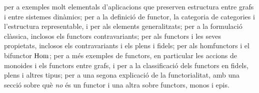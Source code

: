 \begin{resumcap}
 \cite[part~III, sessions~11--17]{lawvereschanuel} per a exemples molt elementals d'aplicacions que preserven estructura entre grafs i entre sistemes dinàmics; \cite[§1.3 i §§7.1--7.2]{awodey} per a la definició de functor, la categoria de categories i l'estructura representable, i \cite[§2.3]{awodey} per als elements generalitzats; \cite[I.3, II.2 i II.5]{maclane} per a la formulació clàssica, inclosos els functors contravariants; \cite[§1.2]{leinster} per als functors i les seves propietats, inclosos els contravariants i els plens i fidels; \cite[cap.~1]{riehl} per als homfunctors i el bifunctor $\operatorname{Hom}$; \cite[§§3.1--3.3]{barrwells} per a més exemples de functors, en particular les accions de monoides i els functors entre grafs, i per a la classificació dels functors en fidels, plens i altres tipus; \cite[§1.3 i §§1.5.1--1.5.3]{perrone-notes} per a una segona explicació de la functorialitat, amb una secció sobre què \emph{no} és un functor i una altra sobre functors, monos i epis.
\end{resumcap}
